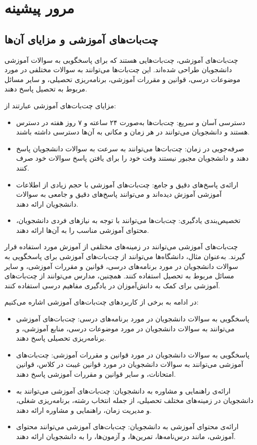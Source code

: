 \chapter{مرور پیشینه}

\section{چت‌بات‌های آموزشی و مزایای آن‌ها}

 چت‌بات‌های آموزشی، چت‌بات‌هایی هستند که برای پاسخگویی به سوالات آموزشی دانشجویان طراحی شده‌اند. این چت‌بات‌ها می‌توانند به سوالات مختلفی در مورد موضوعات درسی، قوانین و مقررات آموزشی، برنامه‌ریزی تحصیلی، و سایر مسائل مربوط به تحصیل پاسخ دهند.

مزایای چت‌بات‌های آموزشی عبارتند از:

\begin{itemize}
    \item دسترسی آسان و سریع: چت‌بات‌ها به‌صورت ۲۴ ساعته و ۷ روز هفته در دسترس هستند و دانشجویان می‌توانند در هر زمان و مکانی به آن‌ها دسترسی داشته باشند.
    \item صرفه‌جویی در زمان: چت‌بات‌ها می‌توانند به سرعت به سوالات دانشجویان پاسخ دهند و دانشجویان مجبور نیستند وقت خود را برای یافتن پاسخ سوالات خود صرف کنند.
    \item ارائه‌ی پاسخ‌های دقیق و جامع: چت‌بات‌های آموزشی با حجم زیادی از اطلاعات آموزشی آموزش دیده‌اند و می‌توانند پاسخ‌های دقیق و جامعی به سوالات دانشجویان ارائه دهند.
    \item تخصیص‌بندی یادگیری: چت‌بات‌ها می‌توانند با توجه به نیازهای فردی دانشجویان، محتوای آموزشی مناسب را به آن‌ها ارائه دهند.
\end{itemize}

چت‌بات‌های آموزشی می‌توانند در زمینه‌های مختلفی از آموزش مورد استفاده قرار گیرند. به‌عنوان مثال، دانشگاه‌ها می‌توانند از چت‌بات‌های آموزشی برای پاسخگویی به سوالات دانشجویان در مورد برنامه‌های درسی، قوانین و مقررات آموزشی، و سایر مسائل مربوط به تحصیل استفاده کنند. همچنین، مدارس می‌توانند از چت‌بات‌های آموزشی برای کمک به دانش‌آموزان در یادگیری مفاهیم درسی استفاده کنند.

در ادامه به برخی از کاربردهای چت‌بات‌های آموزشی اشاره می‌کنیم:

\begin{itemize}
    \item پاسخگویی به سوالات دانشجویان در مورد برنامه‌های درسی: چت‌بات‌های آموزشی می‌توانند به سوالات دانشجویان در مورد موضوعات درسی، منابع آموزشی، و برنامه‌ریزی تحصیلی پاسخ دهند.
    \item پاسخگویی به سوالات دانشجویان در مورد قوانین و مقررات آموزشی: چت‌بات‌های آموزشی می‌توانند به سوالات دانشجویان در مورد قوانین غیبت در کلاس، قوانین امتحانات، و سایر قوانین و مقررات آموزشی پاسخ دهند.
    \item ارائه‌ی راهنمایی و مشاوره به دانشجویان: چت‌بات‌های آموزشی می‌توانند به دانشجویان در زمینه‌های مختلف تحصیلی، از جمله انتخاب رشته، برنامه‌ریزی شغلی، و مدیریت زمان، راهنمایی و مشاوره ارائه دهند.
    \item ارائه‌ی محتوای آموزشی به دانشجویان: چت‌بات‌های آموزشی می‌توانند محتوای آموزشی، مانند درس‌نامه‌ها، تمرین‌ها، و آزمون‌ها، را به دانشجویان ارائه دهند.
\end{itemize}

